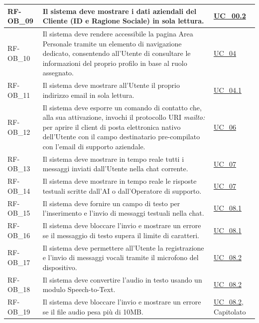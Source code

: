 \begin{longtable}{|>{\raggedright}p{}|>{\raggedright\arraybackslash}p{}|>{\raggedright\arraybackslash}p{}|}
    \hline
    RF-OB\_09 \hypertarget{rf-ob_9} & Il sistema deve mostrare i dati aziendali del Cliente (ID e Ragione Sociale) in sola lettura. & \hyperref[uc_00.2]{UC\_00.2} \\
    \hline
    RF-OB\_10 \hypertarget{rf-ob_10} & Il sistema deve rendere accessibile la pagina Area Personale tramite un elemento di navigazione dedicato, consentendo all'Utente di consultare le informazioni del proprio profilo in base al ruolo assegnato. & \hyperref[uc_04]{UC\_04} \\
    \hline
    RF-OB\_11 \hypertarget{rf-ob_11} & Il sistema deve mostrare all'Utente il proprio indirizzo email in sola lettura. & \hyperref[uc_04.1]{UC\_04.1} \\
    \hline
    RF-OB\_12 \hypertarget{rf-ob_12} & Il sistema deve esporre un comando di contatto che, alla sua attivazione, invochi il protocollo URI \textit{mailto:} per aprire il client di posta elettronica nativo dell'Utente con il campo destinatario pre-compilato con l'email di supporto aziendale. & \hyperref[uc_06]{UC\_06} \\
    \hline
    RF-OB\_13 \hypertarget{rf-ob_13} & Il sistema deve mostrare in tempo reale tutti i messaggi inviati dall'Utente nella chat corrente. & \hyperref[uc_07]{UC\_07} \\
    \hline
    RF-OB\_14 \hypertarget{rf-ob_14} & Il sistema deve mostrare in tempo reale le risposte testuali scritte dall'AI o dall'Operatore di supporto. & \hyperref[uc_07]{UC\_07} \\
    \hline
    RF-OB\_15 \hypertarget{rf-ob_15} & Il sistema deve fornire un campo di testo per l'inserimento e l'invio di messaggi testuali nella chat. & \hyperref[uc_08.1]{UC\_08.1} \\
    \hline
    RF-OB\_16 \hypertarget{rf-ob_16} & Il sistema deve bloccare l'invio e mostrare un errore se il messaggio di testo supera il limite di caratteri. & \hyperref[uc_08.1]{UC\_08.1} \\
    \hline
    RF-OB\_17 \hypertarget{rf-ob_17} & Il sistema deve permettere all'Utente la registrazione e l'invio di messaggi vocali tramite il microfono del dispositivo. & \hyperref[uc_08.2]{UC\_08.2} \\
    \hline
    RF-OB\_18 \hypertarget{rf-ob_18} & Il sistema deve convertire l'audio in testo usando un modulo Speech-to-Text. & \hyperref[uc_08.2]{UC\_08.2} \\
    \hline
    RF-OB\_19 \hypertarget{rf-ob_19} & Il sistema deve bloccare l'invio e mostrare un errore se il file audio pesa più di 10MB. & \hyperref[uc_08.2]{UC\_08.2}, Capitolato \\

\end{longtable}

